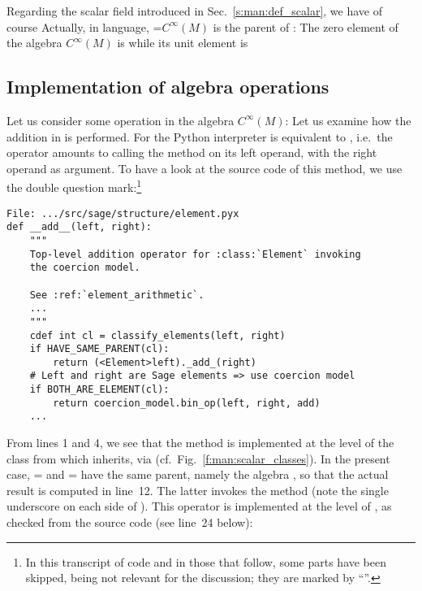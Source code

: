 Regarding the scalar field  introduced in Sec.~\ref{s:man:def_scalar}, we
have of course
Actually, in \Sage{} language, =$C^\infty(M)$ is the parent of :
The zero element of the algebra $C^\infty(M)$ is
while its unit element is

\subsection{Implementation of algebra operations} \label{s:man:add_implement}

Let us consider some operation in the algebra $C^\infty(M)$:
Let us examine how the addition in  is performed. For the Python interpreter
 is equivalent to ,
i.e.\ the \code{+} operator amounts to calling the method  on its
left operand, with the right operand as argument.
To have a look at the source code of this method, we use the double question mark:\footnote{In this
transcript of code and in those that follow, some parts
have been skipped, being not relevant for the discussion; they are marked
by ``''.}
\label{p:man:list___add__}
\begin{lstlisting}
File: .../src/sage/structure/element.pyx
def __add__(left, right):
    """
    Top-level addition operator for :class:`Element` invoking
    the coercion model.

    See :ref:`element_arithmetic`.
    ...
    """
    cdef int cl = classify_elements(left, right)
    if HAVE_SAME_PARENT(cl):
        return (<Element>left)._add_(right)
    # Left and right are Sage elements => use coercion model
    if BOTH_ARE_ELEMENT(cl):
        return coercion_model.bin_op(left, right, add)
    ...
\end{lstlisting}
From lines 1 and 4, we
see that the method  is implemented at the level
of the class  from which  inherits, via
 (cf.\ Fig.~\ref{f:man:scalar_classes}).
In the present case,  =  and  = 
have the same parent, namely the algebra , so that the actual
result is computed in line~12. The latter invokes the method 
(note the single underscore on each side of ). This operator is
implemented at the level of , as checked from the source code (see line~24 below):
